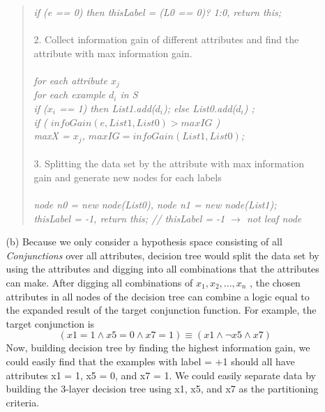 \begin{enumerate}
\begin{itemize}
\begin{quote}
\hspace*{10pt} \textit{if (e == 0) then thisLabel = (L0 == 0)? 1:0, return this;}\\\\
2. Collect information gain of different attributes and find the attribute with max information gain.\\\\
\hspace*{10pt} \textit{for each attribute $x_{j}$ }\\  
	\hspace*{20pt} \textit{for each example $d_{i}$ in S}\\
		\hspace*{30pt} \textit{if  ($x_{i}$ == 1) then List1.add($d_{i}$); else List0.add($d_{i}$) ; }\\
	\hspace*{20pt} \textit{if ( $ infoGain(e, List1, List0) > maxIG$ ) \\
 \hspace*{30pt} maxX = $x_{j}$, $ maxIG = infoGain(List1,List0)$; }\\\\
3. Splitting the data set by the attribute with max information gain and generate new nodes for each labels\\\\
	\hspace*{10pt} \textit{node n0 = new node(List0), node n1 = new node(List1); }\\
	\hspace*{10pt} \textit{thisLabel = -1, return this; // thisLabel = -1 $\rightarrow$ not leaf node}
 \end{quote}
 \item[(b)] Because we only consider a hypothesis space consisting of all \textit{Conjunctions} over all attributes, decision tree would split the data set by using the attributes and digging into all combinations that the attributes can make. After digging all combinations of ${x_{1}, x_{2},...,x_{n}}$ , the chosen attributes in all nodes of the decision tree can combine a logic equal to the expanded result of the target conjunction function. For example, the target conjunction is \[(x1 =1 \wedge x5 =0 \wedge x7 =1) \equiv (x1 \wedge \lnot x5 \wedge x7)\]Now, building decision tree by finding the highest information gain, we could easily find that the examples with label = +1 should all have attributes x1 = 1, x5 = 0, and x7 = 1. We could easily separate data by building the 3-layer decision tree using x1, x5, and x7 as the partitioning criteria.

\end{itemize}
\end{enumerate}
